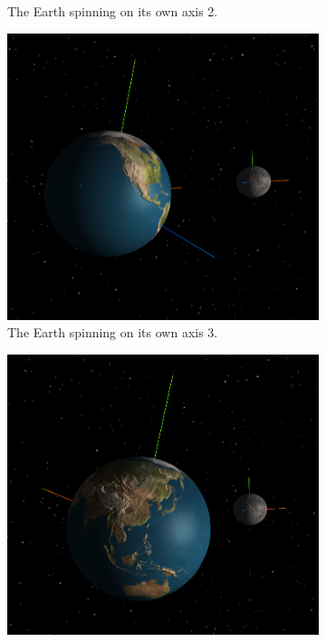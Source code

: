 \documentclass[12pt]{article}
\begin{document}
\begin{figure}[H]
\begin{subfigure}[b]{0.4\textwidth}
                \caption{The Earth spinning on its own axis 2.}
                \label{fig: The axial spin of the Earth 2.}
       \end{subfigure}
               \begin{subfigure}[b]{0.4\textwidth}
                \includegraphics[width=\textwidth]{images/earthandmoonaxisspin3}
                \caption{The Earth spinning on its own axis 3.}
                \label{fig: The axial spin of the Earth 3.}
       \end{subfigure}
               \begin{subfigure}[b]{0.4\textwidth}
                \includegraphics[width=\textwidth]{images/earthandmoonaxisspin4}

\end{subfigure}
\end{figure}
\end{document}
